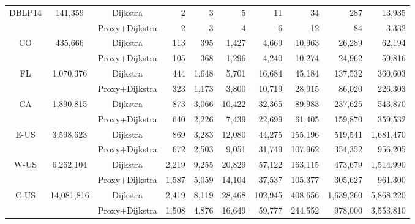 \begin{table}[t!]
\begin{center}
\begin{scriptsize}
\begin{tabular}{|c|c|c||r|r|r|r|r|r|r|}
 \multirow{2}{*}{DBLP14}&  \multirow{2}{*}{141,359} & Dijkstra & 2          & 3   & 5 & 11 & 34 & 287 & 13,935 \\ \cline{3-10}
                       & & Proxy+Dijkstra & {2} & {3} & {4} & {6} & {12} & {84} & {3,332} \\ \hline \hline
 \multirow{2}{*}{CO}&  \multirow{2}{*}{435,666}     & Dijkstra & 113 & 395 & 1,427 & 4,669 & 10,963 & 26,289 & 62,194 \\ \cline{3-10}
                      &  & Proxy+Dijkstra & {105} & {368} & {1,296} & {4,240} & {10,274} & {24,962} & {59,816} \\ \hline
 \multirow{2}{*}{FL}  &  \multirow{2}{*}{1,070,376}   & Dijkstra & 444 & 1,648 & 5,701 & 16,684 & 45,184 & 137,532 & 360,603 \\ \cline{3-10}
                    &   & Proxy+Dijkstra & {323} & {1,173} & {3,800} & {10,719} & {28,915} & {86,020}  & {226,303} \\ \hline
 \multirow{2}{*}{CA} &  \multirow{2}{*}{1,890,815}   & Dijkstra & 873 & 3,066 & 10,422 & 32,365 & 89,983 & 237,625 & 543,870 \\ \cline{3-10}
                      &  & Proxy+Dijkstra & {640} & {2,226} & {7,439}  & {22,699} & {61,405} & {159,870} & {359,532} \\ \hline
 \multirow{2}{*}{E-US}&  \multirow{2}{*}{3,598,623}   & Dijkstra & 869 & 3,283 & 12,080 & 44,275 & 155,196 & 519,541 & 1,681,470 \\ \cline{3-10}
                      &  & Proxy+Dijkstra & {672} & {2,503} & {9,051}  & {31,749} & {107,962} & {354,352} & {956,205} \\ \hline
 \multirow{2}{*}{W-US} & \multirow{2}{*}{6,262,104}   & Dijkstra & 2,219 & 9,255 & 20,829 & 57,122 & 163,115 & 473,679 & 1,514,990 \\ \cline{3-10}
                     &  & Proxy+Dijkstra & {1,587} & {5,059} & {14,104} & {37,537} & {105,377} & {305,627} & {961,300} \\ \hline
 \multirow{2}{*}{C-US}& \multirow{2}{*}{14,081,816}   & Dijkstra & 2,419 & 8,119 & 28,468 & 102,945 & 408,656 & 1,639,260 & 5,868,220 \\ \cline{3-10}
                      &  & Proxy+Dijkstra & {1,508} & {4,876} & {16,649} & {59,777} & {244,552} & {978,000} & {3,553,810} \\ \hline
\end{tabular}
\end{scriptsize}
\end{center}
\vspace{-2ex}
\end{table}

